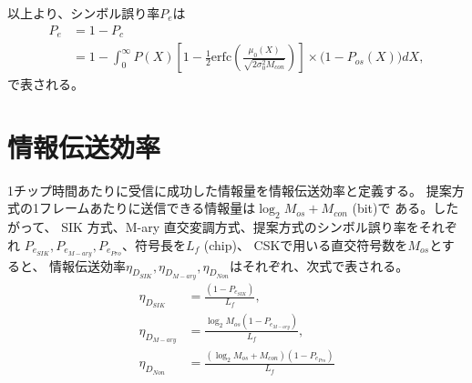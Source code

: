 以上より、シンボル誤り率$P_e$は
\begin{align}
\label{Pe}
P_e&=1-P_c \nonumber \\
&=1-\int_{0}^{\infty} P(X) \left[ 1 - \frac{1}{2} \mathrm{erfc} \left( \frac{\mu_0(X)}{\sqrt{2\sigma_0^2 M_{con}}} \right) \right] \times  \big(1-P_{os}(X)\big) dX,
\end{align}
で表される。

\section{情報伝送効率}
1チップ時間あたりに受信に成功した情報量を情報伝送効率と定義する。
提案方式の1フレームあたりに送信できる情報量は$\log_2 M_{os} + M_{con}$ (bit)で
ある。したがって、
SIK 方式、M-ary 直交変調方式、提案方式のシンボル誤り率をそれぞれ
$P_{e_{SIK}}, P_{e_{M-ary}}, P_{e_{Pro}}$、符号長を$L_f$ (chip)、
CSKで用いる直交符号数を$M_{os}$とすると、
情報伝送効率$\eta_{D_{SIK}}, 
\eta_{D_{M-ary}}, \eta_{D_{Non}}$はそれぞれ、次式で表される。
\begin{align}
\eta_{D_{SIK}} &= \frac{(1-P_{e_{SIK}})}{L_f}, \nonumber \\
\eta_{D_{M-ary}} &= \frac{\log_2 M_{os} (1-P_{e_{M-ary}})}{L_f}, \nonumber \\
\eta_{D_{Non}} &= \frac{(\log_2 M_{os} + M_{con})(1-P_{e_{Pro}})}{L_f} \nonumber \\
\end{align}
%
